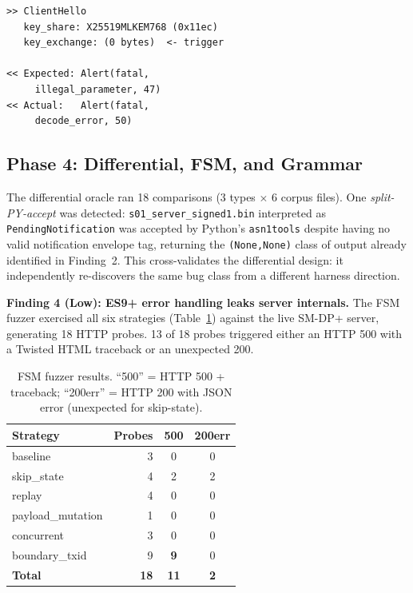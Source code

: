 \documentclass[final,3p,times,twocolumn]{elsarticle}
\begin{document}
\begin{lstlisting}[style=tlslogstyle,caption={TLS 1.3 wire exchange for Finding~3. OpenSSL 3.6.0 emits alert 50 (\texttt{decode\_error}) where RFC~8446 §6.2 specifies alert 47 (\texttt{illegal\_parameter}).},label=lst:tls_wire]
>> ClientHello
   key_share: X25519MLKEM768 (0x11ec)
   key_exchange: (0 bytes)  <- trigger

<< Expected: Alert(fatal,
     illegal_parameter, 47)
<< Actual:   Alert(fatal,
     decode_error, 50)
\end{lstlisting}

\subsection{Phase 4: Differential, FSM, and Grammar}

The differential oracle ran 18 comparisons (3 types $\times$ 6 corpus files).
One \textit{split-PY-accept} was detected: \texttt{s01\_server\_signed1.bin}
interpreted as \texttt{PendingNotification} was accepted by Python's
\texttt{asn1tools} despite having no valid notification envelope tag,
returning the \texttt{(None,None)} class of output already identified in
Finding~2.
This cross-validates the differential design: it independently re-discovers
the same bug class from a different harness direction.

\textbf{Finding 4 (Low): ES9+ error handling leaks server internals.}
The FSM fuzzer exercised all six strategies (Table~\ref{tab:fsm}) against
the live SM-DP+ server, generating 18 HTTP probes.
13 of 18 probes triggered either an HTTP 500 with a Twisted HTML
traceback or an unexpected 200.

\begin{table}[h]
\centering
\caption{FSM fuzzer results. ``500'' = HTTP 500 + traceback;
``200err'' = HTTP 200 with JSON error (unexpected for skip-state).}
\label{tab:fsm}
\begin{tabular}{@{}lrcc@{}}
\toprule
Strategy & Probes & 500 & 200err \\
\midrule
baseline          & 3  & 0 & 0 \\
skip\_state       & 4  & 2 & 2 \\
replay            & 4  & 0 & 0 \\
payload\_mutation & 1  & 0 & 0 \\
concurrent        & 3  & 0 & 0 \\
boundary\_txid    & 9  & \textbf{9} & 0 \\
\midrule
\textbf{Total}    & \textbf{18} & \textbf{11} & \textbf{2} \\
\bottomrule
\end{tabular}
\end{table}
\end{document}
